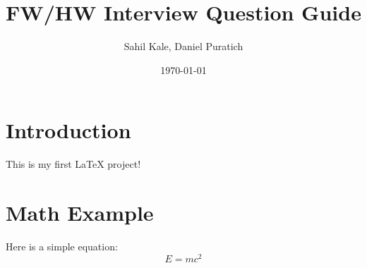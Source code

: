 \documentclass[a4paper,12pt]{article}
\title{FW/HW Interview Question Guide}
\author{Sahil Kale, Daniel Puratich}
\date{\today}
\begin{document}
\maketitle

\section{Introduction}
This is my first LaTeX project!

\section{Math Example}
Here is a simple equation:
\begin{equation}
   E = mc^2
\end{equation}
\end{document}
